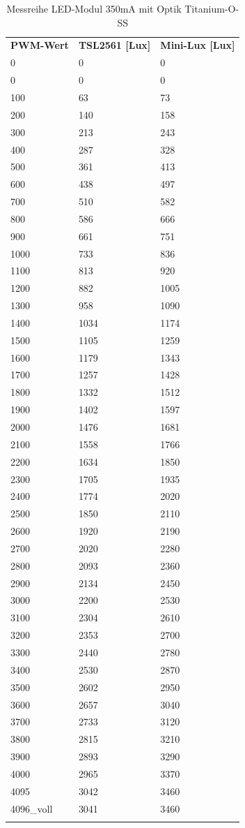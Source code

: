 \documentclass[a4paper,12pt]{scrartcl}
\begin{document}
\begin{longtable}[H]{p{35mm}>{\columncolor[gray]{0.97}}p{35mm}p{35mm}}
  \rowcolor[gray]{.9}
    \textbf{PWM-Wert} & \textbf{TSL2561 [Lux]} & \textbf{Mini-Lux [Lux]} \\ 
0 & 0 & 0 \\
0	&	0	&	0	\\
100	&	63	&	73	\\
200	&	140	&	158	\\
300	&	213	&	243	\\
400	&	287	&	328	\\
500	&	361	&	413	\\
600	&	438	&	497	\\
700	&	510	&	582	\\
800	&	586	&	666	\\
900	&	661	&	751	\\
1000	&	733	&	836	\\
1100	&	813	&	920	\\
1200	&	882	&	1005	\\
1300	&	958	&	1090	\\
1400	&	1034	&	1174	\\
1500	&	1105	&	1259	\\
1600	&	1179	&	1343	\\
1700	&	1257	&	1428	\\
1800	&	1332	&	1512	\\
1900	&	1402	&	1597	\\
2000	&	1476	&	1681	\\
2100	&	1558	&	1766	\\
2200	&	1634	&	1850	\\
2300	&	1705	&	1935	\\
2400	&	1774	&	2020	\\
2500	&	1850	&	2110	\\
2600	&	1920	&	2190	\\
2700	&	2020	&	2280	\\
2800	&	2093	&	2360	\\
2900	&	2134	&	2450	\\
3000	&	2200	&	2530	\\
3100	&	2304	&	2610	\\
3200	&	2353	&	2700	\\
3300	&	2440	&	2780	\\
3400	&	2530	&	2870	\\
3500	&	2602	&	2950	\\
3600	&	2657	&	3040	\\
3700	&	2733	&	3120	\\
3800	&	2815	&	3210	\\
3900	&	2893	&	3290	\\
4000	&	2965	&	3370	\\
4095	&	3042	&	3460	\\
4096\_voll	&	3041	&	3460	\\
\caption{Messreihe LED-Modul 350mA mit Optik Titanium-O-SS}
\label{tab:350maTitSS}
\end{longtable}
\end{document}
